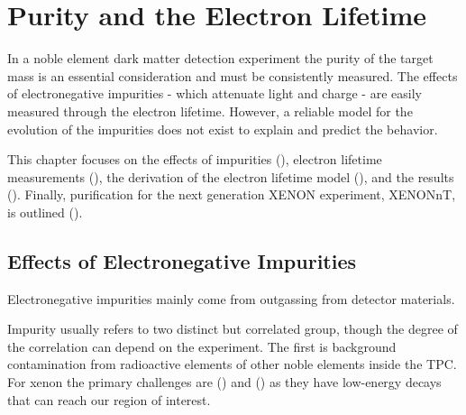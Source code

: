 

\pagestyle{cu}
\graphicspath{{./Chapter5/Figures/}}
\chapter[Purity and the Electron Lifetime][Purity and the Electron Lifetime]{Purity and the Electron Lifetime}
\label{chap:purification}

In a noble element dark matter detection experiment the purity of the target mass is an essential consideration and must be consistently
measured.  The effects of electronegative impurities - which attenuate light and charge - are easily measured through the electron
lifetime.  However, a reliable model for the evolution of the impurities does not exist to explain and predict the behavior.

This chapter focuses on the effects of impurities (), electron lifetime measurements
(), the derivation of the electron lifetime model (), and
the results ().  Finally, purification for the next generation XENON experiment, XENONnT, is outlined
().



\section{Effects of Electronegative Impurities}
\label{sec:importance_procedure_effects}
Electronegative impurities mainly come from outgassing from detector materials.

Impurity usually refers to two distinct but correlated group, though the degree of the correlation can depend on the
experiment.  The first is background contamination from radioactive elements of other noble elements inside the TPC.  For xenon
the primary challenges are  () and 
() as they have low-energy decays that can reach our region of interest.

